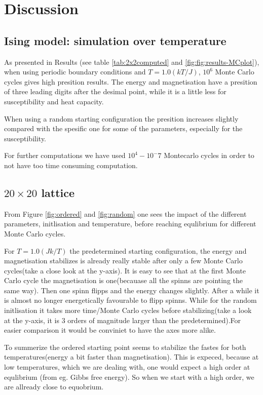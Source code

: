 \documentclass[../main.tex]{subfiles}
\begin{document}
\section{Discussion}

\subsection{Ising model: simulation over temperature}

As presented in Results (see table \ref{tab:2x2computed} and \ref{fig:fig:results-MCplot}), when using periodic boundary conditions and $T = 1.0(kT/J)$, $10^6$ Monte Carlo cycles gives high presition results. The energy and magnetisation have a presition of three leading digits after the desimal point, while it is a little less for susceptibility and heat capacity.

When using a random starting configuration the presition increases slightly compared with the spesific one for some of the parameters, especially for the susceptibility.

For further computations we have used $10^4 - 10^-7$ Montecarlo cycles in order to not have too time consuming computation.

\subsection{$20 \times 20$ lattice}

From Figure \ref{fig:ordered} and \ref{fig:random} one sees the impact of the different parameters, initlisation and temperature, before reaching equlibrium for different Monte Carlo cycles.

For $T=1.0(Jk/T)$ the predetermined starting configuration, the energy and magnetisation stabilizes is already really stable after only a few Monte Carlo cycles(take a close look at the y-axis). It is easy to see that at the first Monte Carlo cycle the magnetisation is one(becauase all the spinns are pointing the same way). Then one spinn flipps and the energy changes slightly. After a while it is almost no longer energetically favourable to flipp spinns.
While for the random initlisation it takes more time/Monte Carlo cycles before stabilizing(take a look at the y-axis, it is 3 orders of magnitude larger than the predetermined).For easier comparison it would be conviniet to have the axes more alike.

To summerize the ordered starting point seems to stabilize the fastes for both temperatures(energy a bit faster than magnetisation). This is expeced, because at low temperatures, which we are dealing with, one would expect a high order at equlibrium (from eg. Gibbs free energy). So when we start with a high order, we are allready close to equobrium.
\end{document}
